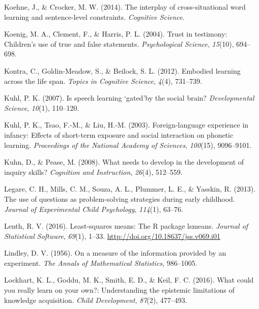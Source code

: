 \documentclass[oneside]{report}
\begin{document}
\leavevmode\hypertarget{ref-koehne2014interplay}{}%
Koehne, J., \& Crocker, M. W. (2014). The interplay of cross-situational
word learning and sentence-level constraints. \emph{Cognitive Science}.

\leavevmode\hypertarget{ref-koenig2004trust}{}%
Koenig, M. A., Clement, F., \& Harris, P. L. (2004). Trust in testimony:
Children's use of true and false statements. \emph{Psychological
Science}, \emph{15}(10), 694--698.

\leavevmode\hypertarget{ref-kontra2012embodied}{}%
Kontra, C., Goldin-Meadow, S., \& Beilock, S. L. (2012). Embodied
learning across the life span. \emph{Topics in Cognitive Science},
\emph{4}(4), 731--739.

\leavevmode\hypertarget{ref-kuhl2007speech}{}%
Kuhl, P. K. (2007). Is speech learning `gated'by the social brain?
\emph{Developmental Science}, \emph{10}(1), 110--120.

\leavevmode\hypertarget{ref-kuhl2003foreign}{}%
Kuhl, P. K., Tsao, F.-M., \& Liu, H.-M. (2003). Foreign-language
experience in infancy: Effects of short-term exposure and social
interaction on phonetic learning. \emph{Proceedings of the National
Academy of Sciences}, \emph{100}(15), 9096--9101.

\leavevmode\hypertarget{ref-kuhn2008needs}{}%
Kuhn, D., \& Pease, M. (2008). What needs to develop in the development
of inquiry skills? \emph{Cognition and Instruction}, \emph{26}(4),
512--559.

\leavevmode\hypertarget{ref-legare2013use}{}%
Legare, C. H., Mills, C. M., Souza, A. L., Plummer, L. E., \& Yasskin,
R. (2013). The use of questions as problem-solving strategies during
early childhood. \emph{Journal of Experimental Child Psychology},
\emph{114}(1), 63--76.

\leavevmode\hypertarget{ref-lenth2016lsmeans}{}%
Lenth, R. V. (2016). Least-squares means: The R package lsmeans.
\emph{Journal of Statistical Software}, \emph{69}(1), 1--33.
\url{http://doi.org/10.18637/jss.v069.i01}

\leavevmode\hypertarget{ref-lindley1956measure}{}%
Lindley, D. V. (1956). On a measure of the information provided by an
experiment. \emph{The Annals of Mathematical Statistics}, 986--1005.

\leavevmode\hypertarget{ref-lockhart2016could}{}%
Lockhart, K. L., Goddu, M. K., Smith, E. D., \& Keil, F. C. (2016). What
could you really learn on your own?: Understanding the epistemic
limitations of knowledge acquisition. \emph{Child Development},
\emph{87}(2), 477--493.
\end{document}
